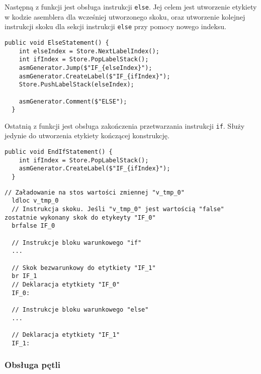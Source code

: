 \par Następną z funkcji jest obsługa instrukcji \texttt{else}. Jej celem jest utworzenie etykiety w kodzie asemblera dla wcześniej utworzonego skoku, oraz utworzenie kolejnej instrukcji skoku dla sekcji instrukcji \texttt{else} przy pomocy nowego indeksu. 

\begin{lstlisting}[language=CSharp, caption={Implementacja funkcji obsługująca sekcje \texttt{else} instrukcji \texttt{if}}, label=alg:if4]
  public void ElseStatement() {
    int elseIndex = Store.NextLabelIndex();
    int ifIndex = Store.PopLabelStack();
    asmGenerator.Jump($"IF_{elseIndex}");
    asmGenerator.CreateLabel($"IF_{ifIndex}");
    Store.PushLabelStack(elseIndex);

    asmGenerator.Comment($"ELSE");
  }
\end{lstlisting}

\par Ostatnią z funkcji jest obsługa zakończenia przetwarzania instrukcji \texttt{if}. Służy jedynie do utworzenia etykiety kończącej konstrukcję.

\begin{lstlisting}[language=CSharp, caption={Implementacja funkcji wywoływanej przy zakończeniu analizy instrukcji \texttt{if}}, label=alg:if5]
  public void EndIfStatement() {
    int ifIndex = Store.PopLabelStack();
    asmGenerator.CreateLabel($"IF_{ifIndex}");
  }
\end{lstlisting}

\begin{lstlisting}[language=IL, caption={Kod assemblera przedstawiający konstrukcję \texttt{if ... else}}, label=alg:if6]
  // Załadowanie na stos wartości zmiennej "v_tmp_0"
  ldloc v_tmp_0
  // Instrukcja skoku. Jeśli "v_tmp_0" jest wartością "false" zostatnie wykonany skok do etykeyty "IF_0"
  brfalse IF_0

  // Instrukcje bloku warunkowego "if"
  ...

  // Skok bezwarunkowy do etytkiety "IF_1"
  br IF_1
  // Deklaracja etytkiety "IF_0"
  IF_0: 

  // Instrukcje bloku warunkowego "else"
  ...

  // Deklaracja etytkiety "IF_1"
  IF_1: 
\end{lstlisting}


\subsubsection{Obsługa pętli}

